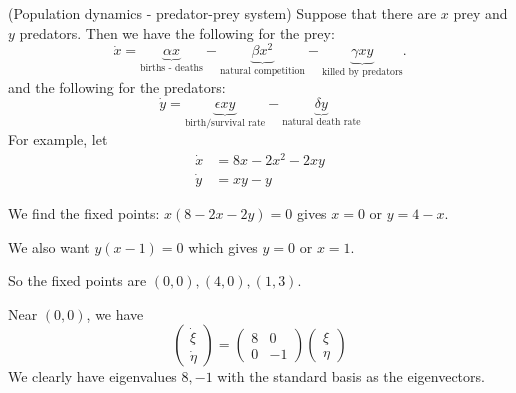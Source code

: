 \documentclass[a4paper]{article}
\begin{document}
    \begin{eg}
      (Population dynamics - predator-prey system) Suppose that there are $x$ prey and $y$ predators. Then we have the following for the prey:
      \[
        \dot x = \underbrace{\alpha x}_{\text{births - deaths}} - \underbrace{\beta x^2}_{\text{natural competition}} - \underbrace{\gamma xy}_{\text{killed by predators}}.
      \]
      and the following for the predators:
      \[
        \dot y = \underbrace{\epsilon xy}_{\text{birth/survival rate}} - \underbrace{\delta y}_{\text{natural death rate}}
      \]
      For example, let
      \begin{align*}
        \dot x &= 8x - 2x^2 - 2xy\\
        \dot y &= xy - y
      \end{align*}

      We find the fixed points: $x(8 - 2x - 2y) = 0$ gives $x = 0$ or $y = 4 - x$.

      We also want $y(x - 1) = 0$ which gives $y = 0$ or $x = 1$.

      So the fixed points are $(0, 0), (4, 0), (1, 3)$.

      Near $(0, 0)$, we have
      \[
        \begin{pmatrix}
          \dot \xi\\\dot \eta
        \end{pmatrix}=
        \begin{pmatrix}
          8 & 0\\
          0 & -1
        \end{pmatrix}
        \begin{pmatrix}
          \xi\\
          \eta
        \end{pmatrix}
      \]
      We clearly have eigenvalues $8, -1$ with the standard basis as the eigenvectors.

      \begin{center}
      \end{center}


\end{eg}
\end{document}
